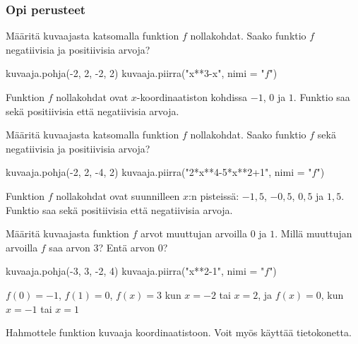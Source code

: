 \begin{tehtavasivu}


\subsubsection*{Opi perusteet}
\begin{tehtava}
Määritä kuvaajasta katsomalla funktion $f$ nollakohdat. Saako funktio $f$ negatiivisia ja positiivisia arvoja?
\begin{kuva}
    kuvaaja.pohja(-2, 2, -2, 2)
    kuvaaja.piirra("x**3-x", nimi = "$f$")
\end{kuva}
\begin{vastaus}
Funktion $f$ nollakohdat ovat $x$-koordinaatiston kohdissa $-1$, $0$ ja $1$. Funktio saa sekä positiivisia että negatiivisia arvoja.
\end{vastaus}
\end{tehtava}

\begin{tehtava}
Määritä kuvaajasta katsomalla funktion $f$ nollakohdat. Saako funktio $f$ sekä negatiivisia ja positiivisia arvoja?
\begin{kuva}
    kuvaaja.pohja(-2, 2, -4, 2)
    kuvaaja.piirra("2*x**4-5*x**2+1", nimi = "$f$")
\end{kuva}
	\begin{vastaus}
Funktion $f$ nollakohdat ovat suunnilleen $x$:n pisteissä: $-1,5$, $-0,5$, $0,5$ ja $1,5$. Funktio saa sekä positiivisia että negatiivisia arvoja.
	\end{vastaus}
\end{tehtava}

\begin{tehtava}
Määritä kuvaajasta funktion $f$ arvot muuttujan arvoilla $0$ ja $1$. Millä muuttujan arvoilla $f$ saa arvon $3$? Entä arvon $0$?
\begin{kuva}
    kuvaaja.pohja(-3, 3, -2, 4)
    kuvaaja.piirra("x**2-1", nimi = "$f$")
\end{kuva}
\begin{vastaus}
 $f(0)=-1$, $f(1)=0$, $f(x)=3$ kun $x=-2$ tai $x=2$, ja $f(x)=0$, kun $x=-1$ tai $x=1$
\end{vastaus}
\end{tehtava}

\begin{tehtava}
Hahmottele funktion kuvaaja koordinaatistoon. Voit myös käyttää tietokonetta.
%	
\end{tehtava} %


\end{tehtavasivu}
